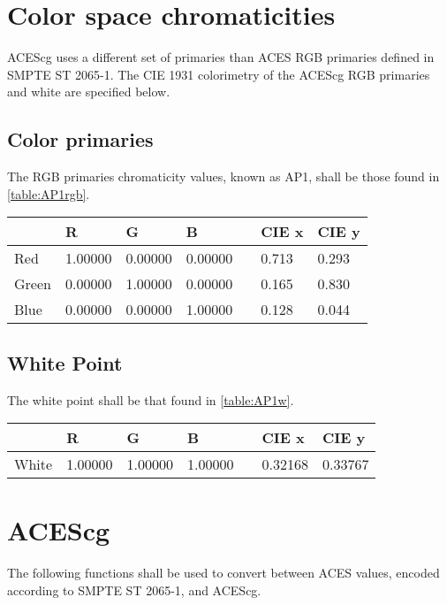 \section{Color space chromaticities}
\label{sec:colorspace}
ACEScg uses a different set of primaries than ACES RGB primaries defined in SMPTE ST 2065-1. The CIE 1931 colorimetry of the ACEScg RGB primaries and white are specified below.

\subsection{Color primaries}
The RGB primaries chromaticity values, known as AP1, shall be those found in \autoref{table:AP1rgb}.

\begin{center}
\begin{tabularx}{4.5in}{XlllXll}
        & R       & G       & B       & & CIE x & CIE y \\ \hline
Red     & 1.00000 & 0.00000 & 0.00000 & & 0.713 & 0.293 \\
Green   & 0.00000 & 1.00000 & 0.00000 & & 0.165 & 0.830 \\
Blue    & 0.00000 & 0.00000 & 1.00000 & & 0.128 & 0.044 \\
\end{tabularx}
\label{table:AP1rgb}
\end{center}

\subsection{White Point}
The white point shall be that found in \autoref{table:AP1w}.

\begin{center}
\begin{tabularx}{4.5in}{XlllXll}
        & R       & G       & B       & & CIE x & CIE y \\ \hline
White   & 1.00000 & 1.00000 & 1.00000 & & 0.32168 & 0.33767 \\
\end{tabularx}
\label{table:AP1w}
\end{center}


\section{ACEScg}
\label{sec:ACEScg}
The following functions shall be used to convert between ACES values, encoded according to SMPTE ST 2065-1, and ACEScg.

